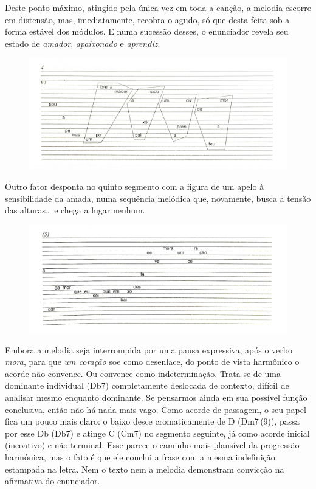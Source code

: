 Deste ponto máximo, atingido pela única vez em toda a canção, a melodia
escorre em distensão, mas, imediatamente, recobra o agudo, só que desta
feita sob a forma estável dos módulos. E numa sucessão desses, o
enunciador revela seu estado de \textit{amador}, \textit{apaixonado} e
\textit{aprendiz}.

\begin{figure}[H]
\includegraphics[width=\textwidth]{./imgs/figura29.jpg}
\end{figure}

Outro fator desponta no quinto segmento com a figura de um apelo à
sensibilidade da amada, numa sequência melódica que, novamente, busca a
tensão das alturas\ldots{} e chega a lugar nenhum.

\begin{figure}[H]
\includegraphics[width=\textwidth]{./imgs/figura30.jpg}
\end{figure}

Embora a melodia seja interrompida por uma pausa expressiva, após o
verbo \textit{mora}, para que \textit{um coração} soe como desenlace, do ponto de
vista harmônico o acorde não convence. Ou convence como indeterminação.
Trata-se de uma dominante individual (Db7) completamente deslocada de
contexto, difícil de analisar mesmo enquanto dominante. Se pensarmos
ainda em sua possível função conclusiva, então não há nada mais vago.
Como acorde de passagem, o seu papel fica um pouco mais claro: o baixo
desce cromaticamente de D (Dm7\,(9)), passa por esse Db (Db7) e atinge
C (Cm7) no segmento seguinte, já como acorde inicial (incoativo) e não
terminal. Esse parece o caminho mais plausível da progressão harmônica,
mas o fato é que ele conclui a frase com a mesma indefinição estampada
na letra. Nem o texto nem a melodia demonstram convicção na afirmativa
do enunciador.

